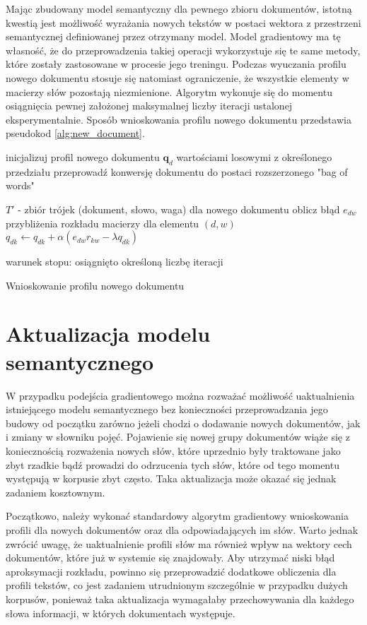 \documentclass{pracamgr}
\begin{document}
Mając zbudowany model semantyczny dla pewnego zbioru dokumentów, istotną kwestią jest możliwość wyrażania nowych tekstów w postaci wektora z przestrzeni semantycznej definiowanej przez otrzymany model. Model gradientowy ma tę własność, że do przeprowadzenia takiej operacji wykorzystuje się te same metody, które zostały zastosowane w procesie jego treningu. Podczas wyuczania profilu nowego dokumentu stosuje się natomiast ograniczenie, że wszystkie elementy w macierzy słów pozostają niezmienione. Algorytm wykonuje się do momentu osiągnięcia pewnej założonej maksymalnej liczby iteracji ustalonej eksperymentalnie. Sposób wnioskowania profilu nowego dokumentu przedstawia pseudokod \ref{alg:new_document}.

\begin{algorithm}
inicjalizuj profil nowego dokumentu $\mathbf{q}_d$ wartościami losowymi z określonego przedziału\;
przeprowadź konwersję dokumentu do postaci rozszerzonego "bag of words"\;
 {
    $T'$ - zbiór trójek (dokument, słowo, waga) dla nowego dokumentu\;
     {
        oblicz błąd $e_{dw}$ przybliżenia rozkładu macierzy dla elementu $(d, w)$\;
         { 
            $q_{dk} \gets q_{dk} + \alpha (e_{dw} r_{kw} - \lambda q_{dk})$\;
        }
    }
    
    warunek stopu: osiągnięto określoną liczbę iteracji
}

\caption{Wnioskowanie profilu nowego dokumentu}
\label{alg:new_document}
\end{algorithm}

\section{Aktualizacja modelu semantycznego}
W przypadku podejścia gradientowego można rozważać możliwość uaktualnienia istniejącego modelu semantycznego bez konieczności przeprowadzania jego budowy od początku zarówno jeżeli chodzi o dodawanie nowych dokumentów, jak i zmiany w słowniku pojęć. Pojawienie się nowej grupy dokumentów wiąże się z koniecznością rozważenia nowych słów, które uprzednio były traktowane jako zbyt rzadkie bądź prowadzi do odrzucenia tych słów, które od tego momentu występują w korpusie zbyt często. Taka aktualizacja może okazać się jednak zadaniem kosztownym. 

Początkowo, należy wykonać standardowy algorytm gradientowy wnioskowania profili dla nowych dokumentów oraz dla odpowiadających im słów. Warto jednak zwrócić uwagę, że uaktualnienie profili słów ma również wpływ na wektory cech dokumentów, które już w systemie się znajdowały. Aby utrzymać niski błąd aproksymacji rozkładu, powinno się przeprowadzić dodatkowe obliczenia dla profili tekstów, co jest zadaniem utrudnionym szczególnie w przypadku dużych korpusów, ponieważ taka aktualizacja wymagałaby przechowywania dla każdego słowa informacji, w których dokumentach występuje. 
\end{document}
